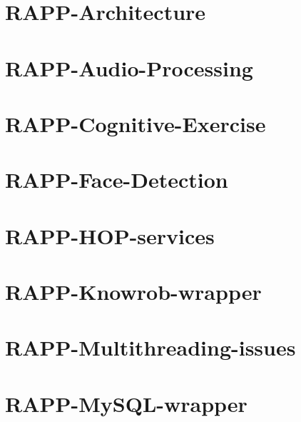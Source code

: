 \documentclass[twoside]{book}
\begin{document}
\chapter{R\-A\-P\-P-\/\-Architecture}
\label{md_rapp-platform_8wiki_RAPP-Architecture}
\hypertarget{md_rapp-platform_8wiki_RAPP-Architecture}{}

\chapter{R\-A\-P\-P-\/\-Audio-\/\-Processing}
\label{md_rapp-platform_8wiki_RAPP-Audio-Processing}
\hypertarget{md_rapp-platform_8wiki_RAPP-Audio-Processing}{}

\chapter{R\-A\-P\-P-\/\-Cognitive-\/\-Exercise}
\label{md_rapp-platform_8wiki_RAPP-Cognitive-Exercise}
\hypertarget{md_rapp-platform_8wiki_RAPP-Cognitive-Exercise}{}

\chapter{R\-A\-P\-P-\/\-Face-\/\-Detection}
\label{md_rapp-platform_8wiki_RAPP-Face-Detection}
\hypertarget{md_rapp-platform_8wiki_RAPP-Face-Detection}{}

\chapter{R\-A\-P\-P-\/\-H\-O\-P-\/services}
\label{md_rapp-platform_8wiki_RAPP-HOP-services}
\hypertarget{md_rapp-platform_8wiki_RAPP-HOP-services}{}

\chapter{R\-A\-P\-P-\/\-Knowrob-\/wrapper}
\label{md_rapp-platform_8wiki_RAPP-Knowrob-wrapper}
\hypertarget{md_rapp-platform_8wiki_RAPP-Knowrob-wrapper}{}

\chapter{R\-A\-P\-P-\/\-Multithreading-\/issues}
\label{md_rapp-platform_8wiki_RAPP-Multithreading-issues}
\hypertarget{md_rapp-platform_8wiki_RAPP-Multithreading-issues}{}

\chapter{R\-A\-P\-P-\/\-My\-S\-Q\-L-\/wrapper}
\label{md_rapp-platform_8wiki_RAPP-MySQL-wrapper}
\hypertarget{md_rapp-platform_8wiki_RAPP-MySQL-wrapper}{}

\end{document}
